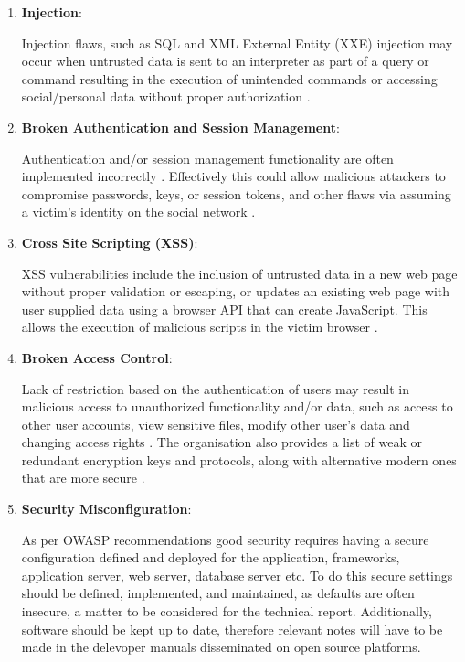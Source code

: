 \begin{enumerate}
    \item \textbf{Injection}:
    
    Injection flaws, such as SQL and XML External Entity (XXE) injection may occur when untrusted data is sent to an interpreter as part of a query or command resulting in the execution of  unintended commands or accessing social/personal data without proper authorization \cite{OWASP2017}.

    \item \textbf{Broken Authentication and Session Management}:
    
    Authentication and/or session management functionality are often implemented incorrectly \cite{OWASP2017}. Effectively this could allow malicious attackers to compromise passwords, keys, or session tokens, and other flaws via assuming a victim's identity on the social network \cite{OWASP2017}.
    

    \item \textbf{Cross Site Scripting (XSS)}:
    
    XSS vulnerabilities include the inclusion of untrusted data in a new web page without proper validation or escaping, or updates an existing web page with user supplied data using a browser API that can create JavaScript. This allows the execution of malicious scripts in the victim browser \cite{OWASP2017}.
    
    \newpage
    
    \item \textbf{Broken Access Control}:
    
    Lack of restriction based on the authentication of users may result in  malicious access to unauthorized functionality and/or data, such as access to other user accounts, view sensitive files, modify other user's data and  changing access rights \cite{OWASP2017}. The organisation also provides a list of weak or redundant encryption keys and protocols, along with alternative modern ones that are more secure \cite{OWASP2017}.
    
    \item \textbf{Security Misconfiguration}:
    
    As per OWASP \cite{OWASP2017} recommendations good security requires having a secure configuration defined and deployed for the application, frameworks, application server, web server, database server etc. To do this secure settings should be defined, implemented, and maintained, as defaults are often insecure, a matter to be considered for the technical report. Additionally, software should be kept up to date\cite{OWASP2017}, therefore relevant notes will have to be made in the delevoper manuals disseminated on open source platforms.
    

\end{enumerate}
